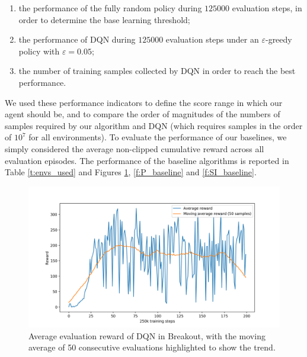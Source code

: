 \begin{enumerate}
    \item the performance of the fully random policy during $125000$ evaluation
    steps, in order to determine the base learning threshold;
    \item the performance of DQN during $125000$ evaluation steps under an 
    $\varepsilon$-greedy policy with $\varepsilon = 0.05$;
    \item the number of training samples collected by DQN in order to reach the
    best performance.
\end{enumerate}
We used these performance indicators to define the score range in which our 
agent should be, and to compare the order of magnitudes of the numbers of 
samples required by our algorithm and DQN (which requires samples in the order 
of $10^7$ for all environments). 
To evaluate the performance of our baselines, we simply considered the average 
non-clipped cumulative reward across all evaluation episodes. 
The performance of the baseline algorithms is reported in Table \ref{t:envs_used} 
and Figures \ref{f:BO_baseline}, \ref{f:P_baseline} and \ref{f:SI_baseline}.
%
\begin{figure}
    \includegraphics[width=\textwidth]{pictures/experiments/baseline_breakout}
    \centering
    \caption[Average performance of DQN in Breakout]{Average evaluation reward 
	    of DQN in Breakout, with the moving average of 50 consecutive 
	    evaluations highlighted to show the trend.}
    \label{f:BO_baseline}
\end{figure}
%
%
